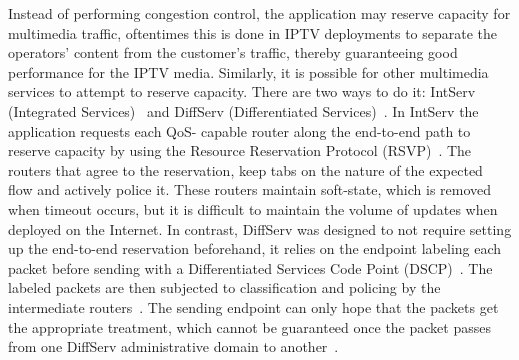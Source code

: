 Instead of performing congestion control, the application may reserve capacity
for multimedia traffic, oftentimes this is done in IPTV deployments to
separate the operators' content from the customer's traffic, thereby
guaranteeing good performance for the IPTV media. Similarly, it is possible
for other multimedia services to attempt to reserve capacity. There are two
ways to do it: IntServ (Integrated Services)~\cite{rfc1633} and DiffServ
(Differentiated Services)~\cite{rfc2474}. In IntServ the application requests
each QoS- capable router along the end-to-end path to reserve capacity by
using the Resource Reservation Protocol (RSVP)~\cite{rfc2205}. The routers
that agree to the reservation, keep tabs on the nature of the expected flow
and actively police it. These routers maintain soft-state, which is removed
when timeout occurs, but it is difficult to maintain the volume of updates
when deployed on the Internet. In contrast, DiffServ was designed to not
require setting up the end-to-end reservation beforehand, it relies on the
endpoint labeling each packet before sending with a Differentiated Services
Code Point (DSCP)~\cite{rfc2475}. The labeled packets are then subjected to
classification and policing by the intermediate routers~\cite{rfc5865}. The
sending endpoint can only hope that the packets get the appropriate treatment,
which cannot be guaranteed once the packet passes from one DiffServ
administrative domain to another~\cite{draft.rtcweb.qos}.





